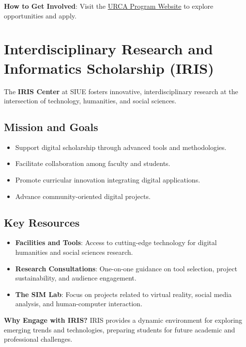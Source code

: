 \documentclass[
]{book}
\providecommand{\tightlist}{%
  \setlength{\itemsep}{0pt}\setlength{\parskip}{0pt}}
\begin{document}
\textbf{How to Get Involved}: Visit the \href{https://www.siue.edu/urca/}{URCA Program Website} to explore opportunities and apply.

\section{Interdisciplinary Research and Informatics Scholarship (IRIS)}\label{interdisciplinary-research-and-informatics-scholarship-iris}

The \textbf{IRIS Center} at SIUE fosters innovative, interdisciplinary research at the intersection of technology, humanities, and social sciences.

\subsection*{Mission and Goals}\label{mission-and-goals}

\begin{itemize}
\tightlist
\item
  Support digital scholarship through advanced tools and methodologies.
\item
  Facilitate collaboration among faculty and students.
\item
  Promote curricular innovation integrating digital applications.
\item
  Advance community-oriented digital projects.
\end{itemize}

\subsection*{Key Resources}\label{key-resources}

\begin{itemize}
\tightlist
\item
  \textbf{Facilities and Tools}: Access to cutting-edge technology for digital humanities and social sciences research.
\item
  \textbf{Research Consultations}: One-on-one guidance on tool selection, project sustainability, and audience engagement.
\item
  \textbf{The SIM Lab}: Focus on projects related to virtual reality, social media analysis, and human-computer interaction.
\end{itemize}

\textbf{Why Engage with IRIS?} IRIS provides a dynamic environment for exploring emerging trends and technologies, preparing students for future academic and professional challenges.
\end{document}
